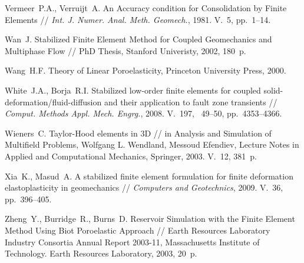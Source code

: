 \begin{thebibliography}{1000}
Vermeer~P.A., Verruijt~A.
An Accuracy condition for Consolidation by Finite Elements //
\emph{Int. J. Numer. Anal. Meth. Geomech.}, 1981. V.~5, pp.~1--14.

Wan~J. Stabilized Finite Element Method for Coupled Geomechanics and  Multiphase Flow //
PhD Thesis, Stanford Univeristy, 2002, 180~p.

Wang~H.F. Theory of Linear Poroelasticity, Princeton University Press, 2000.

White~J.A., Borja~R.I. 
Stabilized low-order finite elements for coupled solid-deformation/fluid-diffusion and their application to fault zone transients //
\emph{Comput. Methods Appl. Mech. Engrg.}, 2008.
V.~197, \No~49--50, pp.~4353--4366.

Wieners~C.
Taylor-Hood elements in 3D // in Analysis and Simulation of Multifield Problems, 
Wolfgang L. Wendland, Messoud Efendiev, Lecture Notes in Applied and Computational Mechanics, Springer, 2003.
V.~12, 381~p.

Xia~K., Masud~A.
A stabilized finite element formulation for finite deformation
elastoplasticity in geomechanics // \emph{Computers and Geotechnics}, 2009.
V.~36, pp.~396--405.

Zheng~Y., Burridge~R., Burns~D.
Reservoir Simulation with the Finite Element Method Using Biot Poroelastic Approach // 
Earth Resources Laboratory Industry Consortia Annual Report 2003-11, 
Massachusetts Institute of Technology. Earth Resources Laboratory, 2003, 20~p.

\end{thebibliography}

\endinput
